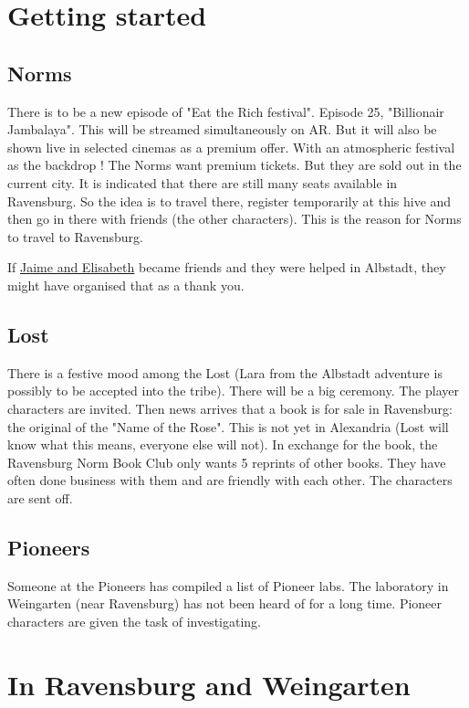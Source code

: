 \section{Getting started}

\subsection{Norms}
There is to be a new episode of "Eat the Rich festival". Episode 25, "Billionair Jambalaya". This will be streamed simultaneously on AR. But it will also be shown live in selected cinemas as a premium offer. With an atmospheric festival as the backdrop !
The Norms want premium tickets. But they are sold out in the current city. It is indicated that there are still many seats available in Ravensburg. So the idea is to travel there, register temporarily at this hive and then go in there with friends (the other characters).
This is the reason for Norms to travel to Ravensburg.

If \hyperref[sec:Jaime and Elisabeth]{Jaime and Elisabeth} became friends and they were helped in Albstadt, they might have organised that as a thank you.

\subsection{Lost}

There is a festive mood among the Lost (Lara from the Albstadt adventure is possibly to be accepted into the tribe). There will be a big ceremony. The player characters are invited. Then news arrives that a book is for sale in Ravensburg: the original of the "Name of the Rose". This is not yet in Alexandria (Lost will know what this means, everyone else will not).
In exchange for the book, the Ravensburg Norm Book Club only wants 5 reprints of other books.
They have often done business with them and are friendly with each other.
The characters are sent off.

\subsection{Pioneers}

Someone at the Pioneers has compiled a list of Pioneer labs. The laboratory in Weingarten (near Ravensburg) has not been heard of for a long time. Pioneer characters are given the task of investigating.

\section{In Ravensburg and Weingarten}

